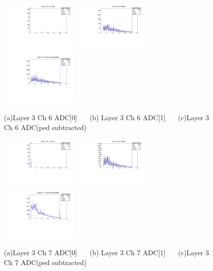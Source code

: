 \documentclass[a4paper,11pt]{article}
\theoremstyle{mytheor}
\begin{document}
\clearpage 
\begin{figure}[H] 
\vspace*{-0.3cm} 
\includegraphics[width=0.33\textwidth,scale=0.5,trim=0 0 0 0,clip]{plotsdir/file0_test-Layer3_Ch6_adc0-1.pdf} 
\includegraphics[width=0.33\textwidth,scale=0.5,trim=0 0 0 0,clip]{plotsdir/file0_test-Layer3_Ch6_adc1-1.pdf} 
\includegraphics[width=0.33\textwidth,scale=0.5,trim=0 0 0 0,clip]{plotsdir/file0_test-Layer3_Ch6_adcPedsub-1.pdf} 
\caption{(a)Layer 3 Ch 6 ADC[0] ~~~(b) Layer 3 Ch 6 ADC[1] ~~~(c)Layer 3 Ch 6 ADC(ped subtracted) } 
\end{figure} 
\begin{figure}[H] 
\vspace*{-0.3cm} 
\includegraphics[width=0.33\textwidth,scale=0.5,trim=0 0 0 0,clip]{plotsdir/file0_test-Layer3_Ch7_adc0-1.pdf} 
\includegraphics[width=0.33\textwidth,scale=0.5,trim=0 0 0 0,clip]{plotsdir/file0_test-Layer3_Ch7_adc1-1.pdf} 
\includegraphics[width=0.33\textwidth,scale=0.5,trim=0 0 0 0,clip]{plotsdir/file0_test-Layer3_Ch7_adcPedsub-1.pdf} 
\caption{(a)Layer 3 Ch 7 ADC[0] ~~~(b) Layer 3 Ch 7 ADC[1] ~~~(c)Layer 3 Ch 7 ADC(ped subtracted) } 
\end{figure} 
\end{document}
